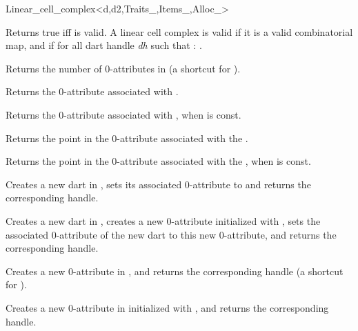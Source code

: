 \begin{ccRefClass}{Linear_cell_complex<d,d2,Traits_,Items_,Alloc_>}

         {Returns true iff  is valid.}
A linear cell complex  is valid  
if it is a valid combinatorial map, and if for all dart handle \emph{dh} such that 
\myin{}: .


{Returns the number of 0-attributes in 
       (a shortcut for ).}
 

{Returns the 0-attribute associated with .
}

{Returns the 0-attribute associated with , when  is const.
}

{Returns the point in the 0-attribute associated with the .
}

{Returns the point in the 0-attribute associated with the , 
  when  is const.
}

   {Creates a new dart in , sets its associated 0-attribute
     to  and returns the corresponding handle.
   }

{Creates a new dart in , creates a new 0-attribute 
  initialized with , sets the associated 0-attribute
  of the new dart to this new 0-attribute, 
  and returns the corresponding handle.}

{Creates a new 0-attribute in , and returns the corresponding handle
  (a shortcut for ).}

{Creates a new 0-attribute in  initialized with ,
  and returns the corresponding handle.}


\end{ccRefClass}
